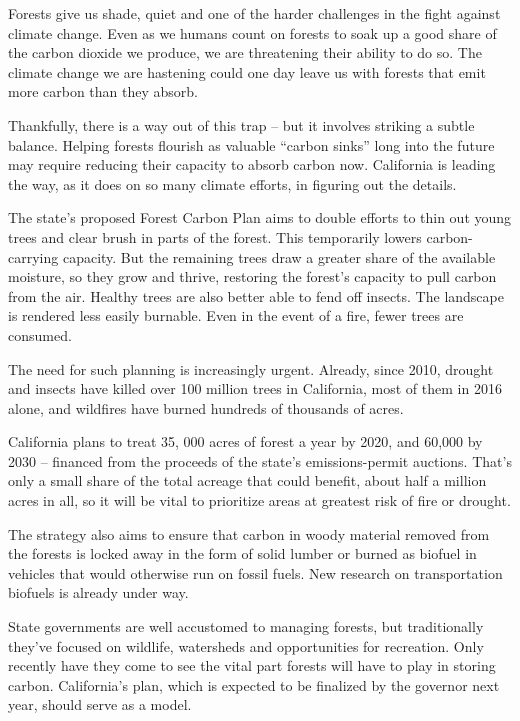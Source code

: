 Forests give us shade, quiet and one of the harder challenges in the fight against climate change. Even as we humans count on forests to soak up a good share of the carbon dioxide we produce, we are threatening their ability to do so. The climate change we are hastening could one day leave us with forests that emit more carbon than they absorb.


Thankfully, there is a way out of this trap – but it involves striking a subtle balance. Helping forests flourish as valuable ``carbon sinks'' long into the future may require reducing their capacity to absorb carbon now. California is leading the way, as it does on so many climate efforts, in figuring out the details.


The state's proposed Forest Carbon Plan aims to double efforts to thin out young trees and clear brush in parts of the forest. This temporarily lowers carbon-carrying capacity. But the remaining trees draw a greater share of the available moisture, so they grow and thrive, restoring the forest's capacity to pull carbon from the air. Healthy trees are also better able to fend off insects. The landscape is rendered less easily burnable. Even in the event of a fire, fewer trees are consumed.


The need for such planning is increasingly urgent. Already, since 2010, drought and insects have killed over 100 million trees in California, most of them in 2016 alone, and wildfires have burned hundreds of thousands of acres.


California plans to treat 35, 000 acres of forest a year by 2020, and 60,000 by 2030 – financed from the proceeds of the state's emissions-permit auctions. That's only a small share of the total acreage that could benefit, about half a million acres in all, so it will be vital to prioritize areas at greatest risk of fire or drought.


The strategy also aims to ensure that carbon in woody material removed from the forests is locked away in the form of solid lumber or burned as biofuel in vehicles that would otherwise run on fossil fuels. New research on transportation biofuels is already under way.


State governments are well accustomed to managing forests, but traditionally they've focused on wildlife, watersheds and opportunities for recreation. Only recently have they come to see the vital part forests will have to play in storing carbon. California's plan, which is expected to be finalized by the governor next year, should serve as a model.
